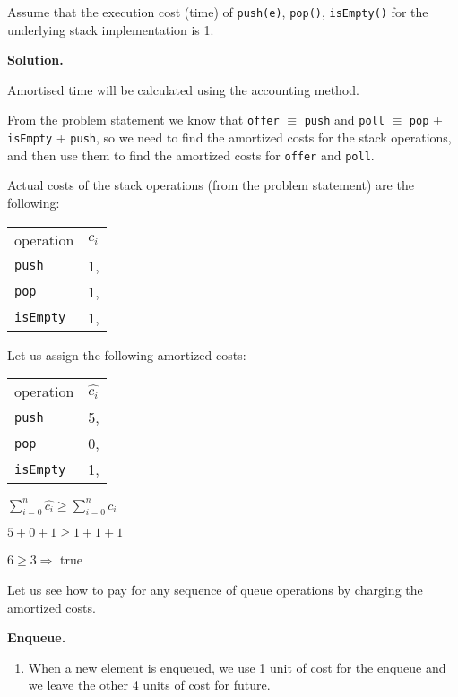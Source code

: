 \documentclass{article}
\begin{document}
\begin{enumerate}
    Assume that the execution cost (time) of \texttt{push(e)}, \texttt{pop()}, \texttt{isEmpty()} for the underlying stack implementation is 1.

    \textbf{Solution.}
    
    Amortised time will be calculated using the accounting method.
    
    From the problem statement we know that \texttt{offer} $\equiv$ \texttt{push} and \texttt{poll} $\equiv$ \texttt{pop} + \texttt{isEmpty} + \texttt{push}, so we need to find the amortized costs for the stack operations, and then use them to find the amortized costs for \texttt{offer} and \texttt{poll}.
    
    Actual costs of the stack operations (from the problem statement) are the following:
    
    \begin{tabular}{ l l }
        operation & $c_i$\\
        \texttt{push} &  1,\\
        \texttt{pop} &  1,\\
        \texttt{isEmpty} &  1,\\
    \end{tabular}

    Let us assign the following amortized costs:

    \begin{tabular}{ l l }
        operation & $\hat{c_i}$\\
        \texttt{push} &  5,\\
        \texttt{pop} &  0,\\
        \texttt{isEmpty} &  1,\\
    \end{tabular}

    $\sum_{i=0}^n{\hat{c_i}} \geq \sum_{i=0}^n{c_i}$
    
    $5 + 0 + 1 \geq 1 + 1 + 1$

    $6 \geq 3 \Rightarrow$ true

    Let us see how to pay for any sequence of queue operations by charging the
amortized costs. 

    \textbf{Enqueue.}
    \begin{enumerate}
        \item When a new element is enqueued, we use 1 unit of cost for the enqueue and we leave the other 4 units of cost for future. 
    \end{enumerate}
    

\end{enumerate}
\end{document}
